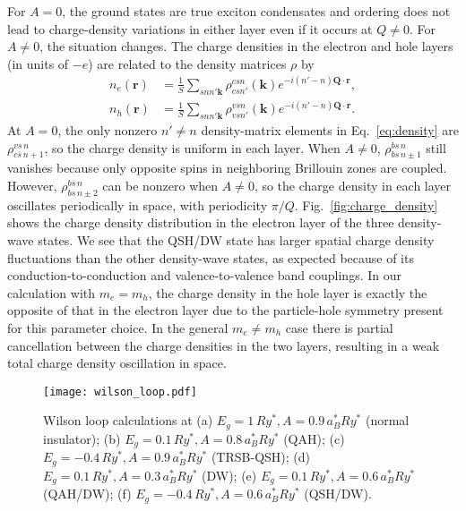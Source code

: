 \documentclass[reprint,aps,superscriptaddress]{revtex4-2}
\begin{document}
For $A=0$, the ground states are true exciton condensates and ordering does not lead to charge-density variations in 
either layer even if it occurs at $Q \ne 0$.  For $A \ne 0$, the situation changes. 
The charge densities in the electron and hole layers (in units of $-e$) are related to the density matrices $\rho$ by 
\begin{equation}
\begin{split}
n_e(\bm r) &= \frac 1S \sum_{snn'\bm k} \rho_{csn'}^{csn}(\bm k) e^{-i(n'-n)\bm Q\cdot\bm r}, \\
n_h(\bm r) &= \frac 1S \sum_{snn'\bm k} \rho_{vsn'}^{vsn}(\bm k) e^{-i(n'-n)\bm Q\cdot\bm r}.
\end{split}
\label{eq:density}
\end{equation}
At $A=0$, the only nonzero $n' \ne n$ density-matrix elements in Eq.~\eqref{eq:density} are $\rho_{c\bar s\, n+1}^{vs\, n}$, 
so the charge density is uniform in each layer. When $A\ne 0$, $\rho^{bs\, n}_{bs\, n\pm 1}$ still vanishes because only opposite spins in neighboring Brillouin zones are coupled. However, $\rho^{bs\, n}_{bs\, n\pm 2}$ can be nonzero when $A\ne 0$, so the charge density in each layer oscillates periodically in space, with periodicity $\pi/Q$. Fig.~\ref{fig:charge_density} shows the charge density distribution in the electron layer of the three density-wave states. We see that the QSH/DW state has larger spatial charge density fluctuations than the other density-wave states, as expected because of its conduction-to-conduction and valence-to-valence band couplings. In our calculation with $m_e=m_h$, the charge density in the hole layer is exactly the opposite of that in the electron layer due to the particle-hole symmetry present for this parameter choice. 
In the general $m_e\ne m_h$ case there is partial cancellation between the charge densities in the two layers, resulting in a weak total charge density oscillation in space. %

\begin{figure}
\centering
\texttt{[image: wilson\_loop.pdf]}
\caption{Wilson loop calculations at (a) $E_g=1\,Ry^*, A=0.9\,a_B^*Ry^*$ (normal insulator); (b) $E_g=0.1\,Ry^*, A=0.8\,a_B^*Ry^*$ (QAH); (c) $E_g=-0.4\,Ry^*, A=0.9\,a_B^*Ry^*$ (TRSB-QSH); (d) $E_g=0.1\,Ry^*, A=0.3\,a_B^*Ry^*$ (DW); (e) $E_g=0.1\,Ry^*, A=0.6\,a_B^*Ry^*$ (QAH/DW); (f) $E_g=-0.4\,Ry^*, A=0.6\,a_B^*Ry^*$ (QSH/DW).} \label{fig:wilson}
\end{figure}
\end{document}
